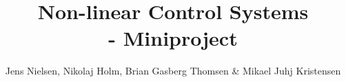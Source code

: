 


\title{\vspace{-2cm} Non-linear Control Systems \\ \Large - Miniproject}
\author{Jens Nielsen, Nikolaj Holm, Brian Gasberg Thomsen \& Mikael Juhj Kristensen}
\date{}


\maketitle
\vspace{-1.5cm}
\tableofcontents








